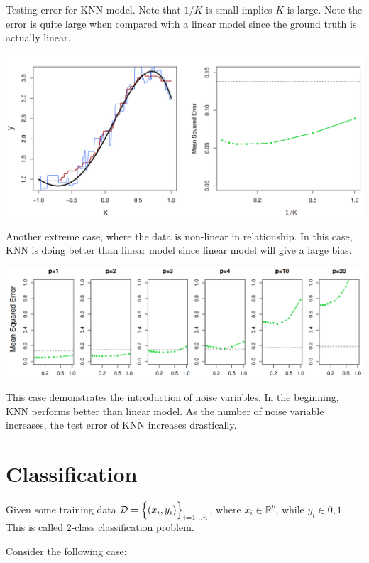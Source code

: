 \documentclass{article}
\theoremstyle{MyNonumberplain}
\theoremstyle{break}
\theoremstyle{break}
\begin{document}
Testing error for KNN model. Note that $1/K$ is small implies $K$ is large. Note the error is quite large when compared
with a linear model since the ground truth is actually linear.

\begin{center}
    \includegraphics*[scale=0.2]{Images/img17.png}
\end{center}

Another extreme case, where the data is non-linear in relationship. In this case, KNN is doing better than linear model since linear model
will give a large bias.

\begin{center}
    \includegraphics*[scale=0.2]{Images/img18.png}
\end{center}

This case demonstrates the introduction of noise variables. In the beginning, KNN performs
better than linear model. As the number of noise variable increases, the test error of KNN increases drastically. 

\section{Classification}

Given some training data $\mathcal{D}=\Bigl\{(x_i,y_i)\Bigr\}_{i=1...n}$, where $x_i\in\mathbb{R}^p$, while $y_i\in{0,1}$.
This is called 2-class classification problem.

Consider the following case:
\end{document}
